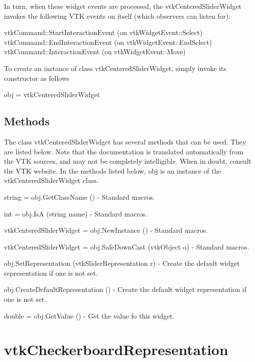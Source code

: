 In turn, when these widget events are processed, the vtk\-Centered\-Slider\-Widget invokes the following V\-T\-K events on itself (which observers can listen for)\-: 
\begin{DoxyPre}
   vtkCommand::StartInteractionEvent (on vtkWidgetEvent::Select)
   vtkCommand::EndInteractionEvent (on vtkWidgetEvent::EndSelect)
   vtkCommand::InteractionEvent (on vtkWidgetEvent::Move)
 \end{DoxyPre}


To create an instance of class vtk\-Centered\-Slider\-Widget, simply invoke its constructor as follows \begin{DoxyVerb}  obj = vtkCenteredSliderWidget
\end{DoxyVerb}
 \hypertarget{vtkwidgets_vtkxyplotwidget_Methods}{}\subsection{Methods}\label{vtkwidgets_vtkxyplotwidget_Methods}
The class vtk\-Centered\-Slider\-Widget has several methods that can be used. They are listed below. Note that the documentation is translated automatically from the V\-T\-K sources, and may not be completely intelligible. When in doubt, consult the V\-T\-K website. In the methods listed below, {\ttfamily obj} is an instance of the vtk\-Centered\-Slider\-Widget class. 
\begin{DoxyItemize}
\item {\ttfamily string = obj.\-Get\-Class\-Name ()} -\/ Standard macros.  
\item {\ttfamily int = obj.\-Is\-A (string name)} -\/ Standard macros.  
\item {\ttfamily vtk\-Centered\-Slider\-Widget = obj.\-New\-Instance ()} -\/ Standard macros.  
\item {\ttfamily vtk\-Centered\-Slider\-Widget = obj.\-Safe\-Down\-Cast (vtk\-Object o)} -\/ Standard macros.  
\item {\ttfamily obj.\-Set\-Representation (vtk\-Slider\-Representation r)} -\/ Create the default widget representation if one is not set.  
\item {\ttfamily obj.\-Create\-Default\-Representation ()} -\/ Create the default widget representation if one is not set.  
\item {\ttfamily double = obj.\-Get\-Value ()} -\/ Get the value fo this widget.  
\end{DoxyItemize}\hypertarget{vtkwidgets_vtkcheckerboardrepresentation}{}\section{vtk\-Checkerboard\-Representation}\label{vtkwidgets_vtkcheckerboardrepresentation}
